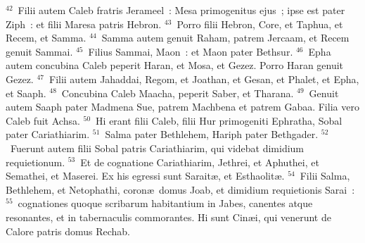 ${}^{42}$~Filii autem Caleb fratris Jerameel~: Mesa primogenitus ejus~; ipse est pater Ziph~: et filii Maresa patris Hebron.
${}^{43}$~Porro filii Hebron, Core, et Taphua, et Recem, et Samma.
${}^{44}$~Samma autem genuit Raham, patrem Jercaam, et Recem genuit Sammai.
${}^{45}$~Filius Sammai, Maon~: et Maon pater Bethsur.
${}^{46}$~Epha autem concubina Caleb peperit Haran, et Mosa, et Gezez. Porro Haran genuit Gezez.
${}^{47}$~Filii autem Jahaddai, Regom, et Joathan, et Gesan, et Phalet, et Epha, et Saaph.
${}^{48}$~Concubina Caleb Maacha, peperit Saber, et Tharana.
${}^{49}$~Genuit autem Saaph pater Madmena Sue, patrem Machbena et patrem Gabaa. Filia vero Caleb fuit Achsa.
${}^{50}$~Hi erant filii Caleb, filii Hur primogeniti Ephratha, Sobal pater Cariathiarim.
${}^{51}$~Salma pater Bethlehem, Hariph pater Bethgader.
${}^{52}$~Fuerunt autem filii Sobal patris Cariathiarim, qui videbat dimidium requietionum.
${}^{53}$~Et de cognatione Cariathiarim, Jethrei, et Aphuthei, et Semathei, et Maserei. Ex his egressi sunt Sarait\ae , et Esthaolit\ae .
${}^{54}$~Filii Salma, Bethlehem, et Netophathi, coron\ae\ domus Joab, et dimidium requietionis Sarai~:
${}^{55}$~cognationes quoque scribarum habitantium in Jabes, canentes atque resonantes, et in tabernaculis commorantes. Hi sunt Cin\ae i, qui venerunt de Calore patris domus Rechab.

